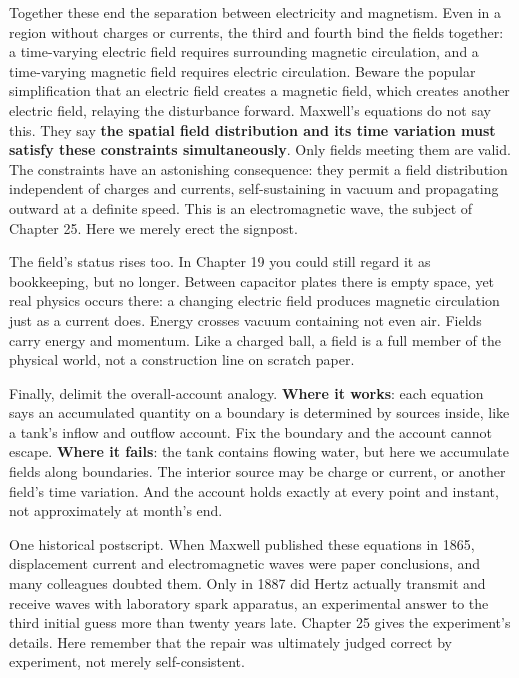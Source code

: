Together these end the separation between electricity and magnetism. Even in a region without charges or currents, the third and fourth bind the fields together: a time-varying electric field requires surrounding magnetic circulation, and a time-varying magnetic field requires electric circulation. Beware the popular simplification that an electric field creates a magnetic field, which creates another electric field, relaying the disturbance forward. Maxwell's equations do not say this. They say \textbf{the spatial field distribution and its time variation must satisfy these constraints simultaneously}. Only fields meeting them are valid. The constraints have an astonishing consequence: they permit a field distribution independent of charges and currents, self-sustaining in vacuum and propagating outward at a definite speed. This is an electromagnetic wave, the subject of Chapter 25. Here we merely erect the signpost.

The field's status rises too. In Chapter 19 you could still regard it as bookkeeping, but no longer. Between capacitor plates there is empty space, yet real physics occurs there: a changing electric field produces magnetic circulation just as a current does. Energy crosses vacuum containing not even air. Fields carry energy and momentum. Like a charged ball, a field is a full member of the physical world, not a construction line on scratch paper.

Finally, delimit the overall-account analogy. \textbf{Where it works}: each equation says an accumulated quantity on a boundary is determined by sources inside, like a tank's inflow and outflow account. Fix the boundary and the account cannot escape. \textbf{Where it fails}: the tank contains flowing water, but here we accumulate fields along boundaries. The interior source may be charge or current, or another field's time variation. And the account holds exactly at every point and instant, not approximately at month's end.

One historical postscript. When Maxwell published these equations in 1865, displacement current and electromagnetic waves were paper conclusions, and many colleagues doubted them. Only in 1887 did Hertz actually transmit and receive waves with laboratory spark apparatus, an experimental answer to the third initial guess more than twenty years late. Chapter 25 gives the experiment's details. Here remember that the repair was ultimately judged correct by experiment, not merely self-consistent.


